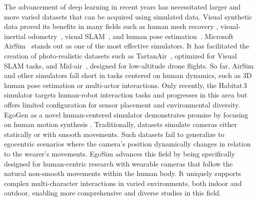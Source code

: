 The advancement of deep learning in recent years has necessitated larger and more varied datasets that can be acquired using simulated data. Visual synthetic data proved its benefits in many fields such as human mesh recovery \cite{bedlam}, visual-inertial odometry~\cite{minoda2021viode}, visual SLAM~\cite{rukhovich2019slam,teed2021droidslam}, and human pose estimation~\cite{varol2017learnng, bedlam}. Microsoft AirSim~\cite{shah2018airsim} stands out as one of the most effective simulators. It has facilitated the creation of photo-realistic datasets such as TartanAir~\cite{tartanair}, optimized for Visual SLAM tasks, and Mid-air~\cite{midair}, designed for low-altitude drone flights.
So far, AirSim \cite{shah2018airsim} and other simulators \cite{dosovitskiy2017carla} fall short in tasks centered on human dynamics, such as 3D human pose estimation or multi-actor interactions. Only recently, the Habitat\,3~\cite{puig2023habitat3} simulator targets human-robot interaction tasks and progresses in this area but offers limited configuration for sensor placement and environmental diversity. EgoGen as a novel human-centered simulator demonstrates promise by focusing on human motion synthesis \cite{liEgoGenEgocentricSynthetic2024apr}.
Traditionally, datasets simulate cameras either statically or with smooth movements. Such datasets fail to generalize to egocentric scenarios where the camera's position dynamically changes in relation to the wearer's movements.
EgoSim advances this field by being specifically designed for human-centric research with wearable cameras that follow the natural non-smooth movements within the human body. It uniquely supports complex multi-character interactions in varied environments, both indoor and outdoor, enabling more comprehensive and diverse studies in this field. 



